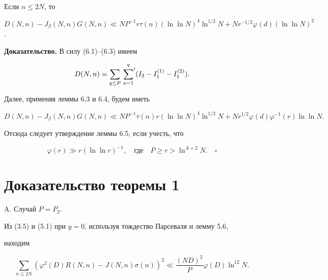 \begin{lems}


Если $n\le 2N$, то


$D(N,n)-J_\beta(N,n) G(N,n)\ll


NP^{-1}r\tau(n)(\ln\ln N)^4\ln^{1/2}N+ Nr^{-1/2}\varphi(d)(\ln\ln N)^2$.


\end{lems}





{\bf Доказательство.} В силу (6.1)--(6.3) имеем


$$


D(N,n)=\sum_{q\le P}\sideset{}{'}\sum_{a=1}^q 


(I_2-I_1^{(1)}-I_1^{(2)}).


$$


Далее, применяя леммы 6.3 и 6.4, будем иметь


$$


D(N,n)-J_\beta(N,n) G(N,n)\ll


NP^{-1}\tau(n)r(\ln\ln N)^4\ln^{1/2}N+


Nr^{1/2}\varphi(d)\varphi^{-1}(r)\ln\ln N.


$$


Отсюда следует утверждение леммы 6.5, если учесть, что 


$$


\varphi(r)\gg r(\ln\ln r)^{-1},\quad


\text{где}


\quad P\ge r>\ln^{A+2}N.\quad\square


$$





\section{Доказательство теоремы 1}





A. Случай $P=P_2$.


Из (3.5) и (5.1) при $y=0$, используя тождество Парсеваля и лемму 5.6,


находим


\begin{equation}


\sum_{n\le 2N}(\varphi^2(D)R(N,n)-J(N,n)\sigma(n))^2 \ll\frac{(ND)^2}{P}


\varphi(D)\ln^{12}N.


\end{equation}


